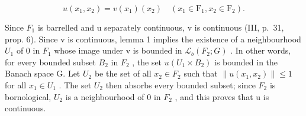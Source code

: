 \[
u (x _ {1}, x _ {2}) = v (x _ {1}) \left(x _ {2}\right) \quad \left(x _ {1} \in \mathrm{F} _ {1}, x _ {2} \in \mathrm{F} _ {2}\right).
\]

Since \(F_{1}\) is barrelled and u separately continuous, v is continuous (III, p.~31, prop. 6). Since v is continuous, lemma 1 implies the existence of a neighbourhood \(U_{1}\) of 0 in \(F_{1}\) whose image under v is bounded in \(\mathcal{L}_{b}(F_{2}; G)\) . In other words, for every bounded subset \(B_{2}\) in \(F_{2}\) , the set \(u(U_{1} \times B_{2})\) is bounded in the Banach space G. Let \(U_{2}\) be the set of all \(x_{2} \in F_{2}\) such that \(\|u(x_{1}, x_{2})\| \leqslant 1\) for all \(x_{1} \in U_{1}\) . The set \(U_{2}\) then absorbs every bounded subset; since \(F_{2}\) is bornological, \(U_{2}\) is a neighbourhood of 0 in \(F_{2}\) , and this proves that u is continuous.

